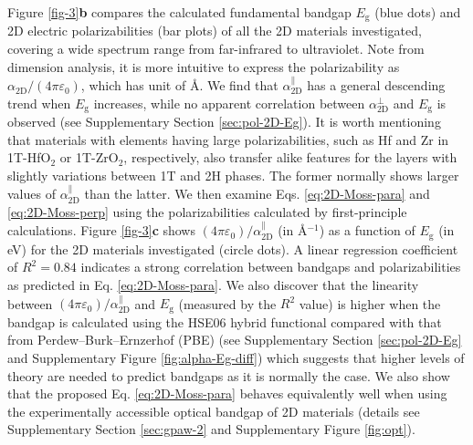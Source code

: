 \documentclass[journal=ancac3,manuscript=article,email=true,hyperref=true,keywords=false]{achemso}
\begin{document}
%
%
%
Figure \ref{fig-3}{\bf b} compares the calculated fundamental bandgap
$E_{\mathrm{g}}$ (blue dots) and 2D electric polarizabilities (bar
plots) of all the 2D materials investigated, covering a wide spectrum
range from far-infrared to ultraviolet.  Note from dimension analysis,
it is more intuitive to express the polarizability as
$\alpha_{\mathrm{2D}}/(4 \pi \varepsilon_{0})$, which has unit of
\AA. We find that $\alpha_{\mathrm{2D}}^{\parallel}$ has a general
descending trend when $E_{\mathrm{g}}$ increases, while no apparent
correlation between $\alpha_{\mathrm{2D}}^{\perp}$ and
$E_{\mathrm{g}}$ is observed (see Supplementary Section
\ref{sec:pol-2D-Eg}). It is worth mentioning that materials with
elements having large polarizabilities, such as Hf and Zr in
1T-HfO$_2$ or 1T-ZrO$_2$, respectively, also transfer alike features
for the layers with slightly variations between 1T and 2H phases. The
former normally shows larger values of
$\alpha_{\mathrm{2D}}^{\parallel}$ than the latter.
%
% 
We then examine Eqs. \ref{eq:2D-Moss-para}
and \ref{eq:2D-Moss-perp} using the polarizabilities calculated by
first-principle calculations. 
Figure \ref{fig-3}{\bf c} shows
$(4 \pi \varepsilon_{0})/\alpha_{\mathrm{2D}}^{\parallel}$ (in
\AA{}$^{-1}$) as a function of $E_{\mathrm{g}}$ (in eV) for the 2D
materials investigated (circle dots).  
A linear regression coefficient of $R^{2}=0.84$ indicates a 
strong correlation between bandgaps and polarizabilities as predicted in 
Eq. \ref{eq:2D-Moss-para}. 
We also discover that
the linearity between
$(4 \pi \varepsilon_{0})/\alpha_{\mathrm{2D}}^{\parallel}$ and
$E_{\mathrm{g}}$ (measured by the $R^{2}$ value) is higher when the
bandgap is calculated using the HSE06 hybrid functional\cite{Heyd_2005} compared
with that from Perdew--Burk--Ernzerhof (PBE) %
(see Supplementary Section \ref{sec:pol-2D-Eg} and
Supplementary Figure \ref{fig:alpha-Eg-diff}) which suggests that higher levels 
of theory are needed to predict bandgaps as it is normally the case.   
We also show
that the proposed Eq. \ref{eq:2D-Moss-para}
behaves equivalently well when using the
experimentally accessible optical bandgap of 2D materials (details see
Supplementary Section \ref{sec:gpaw-2} and Supplementary Figure
\ref{fig:opt}). 
\end{document}
